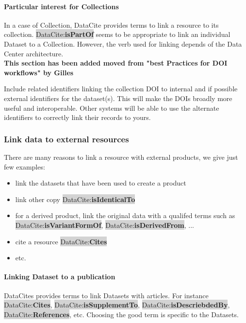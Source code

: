 \documentclass[11pt,a4paper]{ivoa}
\newcommand{\dataciteterm}[1]{\colorbox{lightgray}{DataCite:\textbf{#1}}}
\begin{document}
\paragraph{Particular interest for Collections}
In a case of Collection, DataCite provides terms to link a resource  to its collection. 
\dataciteterm{isPartOf}  seems to be appropriate to link an individual Dataset to a Collection. However, the verb used for linking depends of the Data Center architecture. \\

\textbf{\color{red}This section has been added moved from "best Practices for DOI workflows"  by Gilles }


Include related identifiers linking the collection DOI to internal and if possible external identifiers for the dataset(s). 
This will make the DOIs broadly more useful and interoperable.
Other systems will be able to use the alternate identifiers to correctly link their records to yours.


\subsubsection{Link data to external resources}
There are many reasons to link a resource with external products, we give just few examples:

\begin{itemize}
	\item link the datasets that have been used to create a product 
	\item link other copy \dataciteterm{isIdenticalTo}
	\item for a derived product, link the original data with a qualifed terms such as \dataciteterm{isVariantFormOf}, \dataciteterm{isDerivedFrom}, ...
	\item cite a resource \dataciteterm{Cites}
	\item etc.
\end{itemize}



\paragraph{Linking Dataset to a publication}
DataCites provides terms to link Datasets with articles. For instance \dataciteterm{Cites}, \dataciteterm{isSupplementTo}, \dataciteterm{isDescriebdedBy}, \dataciteterm{References}, etc.
Choosing the good term is specific to the Datasets. \\
\end{document}
